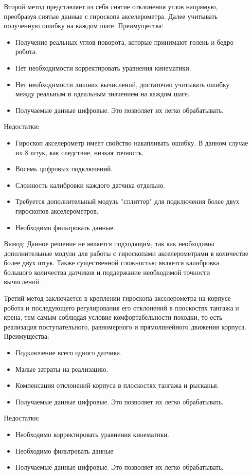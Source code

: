 Второй метод представляет из себя снятие отклонения углов напрямую, преобразуя снятые данные с гироскопа акселерометра. Далее учитывать полученную ошибку на каждом шаге.
\newline
Преимущества:
\begin{itemize}
	\item Получение реальных углов поворота, которые принимают голень и бедро робота.
	\item Нет необходимости корректировать уравнения кинематики.
	\item Нет необходимости лишних вычислений, достаточно учитывать ошибку между реальным и идеальным значением на каждом шаге.
	\item Получаемые данные цифровые. Это позволяет их легко обрабатывать.
\end{itemize}
Недостатки:
\begin{itemize}
	\item Гироскоп акселерометр имеет свойство накапливать ошибку. В данном случае их 8 штук, как следствие, низкая точность.
	\item Восемь цифровых подключений.
	\item Сложность калибровки каждого датчика отдельно.
	\item Требуется дополнительный модуль "сплиттер" для подключения более двух гироскопов акселерометров.
	\item Необходимо фильтровать данные.
\end{itemize}
Вывод:
Данное решение не является подходящим, так как необходимы дополнительные модули для работы с гироскопами акселерометрами в количестве более двух штук. Также существенной сложностью является калибровка большого количества датчиков и поддержание необходимой точности вычислений.
\newline


Третий метод заключается в креплении гироскопа акселерометра на корпусе робота и последующего регулирования его отклонений в плоскостях тангажа и крена, тем самым соблюдая условие комфортабельности походки, то есть реализация поступательного, равномерного и прямолинейного движения корпуса.
\newline
Преимущества:
\begin{itemize}
	\item Подключение всего одного датчика.
	\item Малые затраты на реализацию.
	\item Компенсация отклонений корпуса в плоскостях тангажа и рысканья.
	\item Получаемые данные цифровые. Это позволяет их легко обрабатывать.
\end{itemize}
Недостатки:
\begin{itemize}
	\item Необходимо корректировать уравнения кинематики.
	\item Необходимо фильтровать данные
	\item Получаемые данные цифровые. Это позволяет их легко обрабатывать.
\end{itemize}

